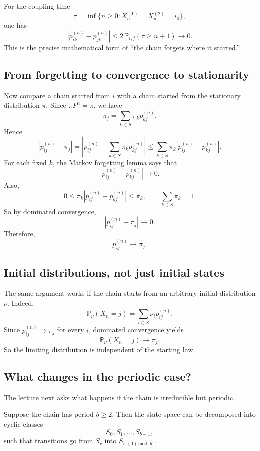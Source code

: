 \documentclass[11pt]{article}
\theoremstyle{definition}
\begin{document}
\begin{keyformula}
For the coupling time
\[
\tau=\inf\{n\ge 0 : X_n^{(1)}=X_n^{(2)}=i_0\},
\]
one has
\[
\left|p_{ik}^{(n)}-p_{jk}^{(n)}\right|
\le
2\,\overline{\mathbb P}_{i,j}(\tau\ge n+1)
\longrightarrow 0.
\]
This is the precise mathematical form of ``the chain forgets where it started.''
\end{keyformula}

\subsection{From forgetting to convergence to stationarity}

Now compare a chain started from \(i\) with a chain started from the stationary distribution \(\pi\). Since \(\pi P^n=\pi\), we have
\[
\pi_j = \sum_{k\in S}\pi_k p_{kj}^{(n)}.
\]
Hence
\[
\left|p_{ij}^{(n)}-\pi_j\right|
=
\left|p_{ij}^{(n)}-\sum_{k\in S}\pi_k p_{kj}^{(n)}\right|
\le
\sum_{k\in S}\pi_k\left|p_{ij}^{(n)}-p_{kj}^{(n)}\right|.
\]
For each fixed \(k\), the Markov forgetting lemma says that
\[
\left|p_{ij}^{(n)}-p_{kj}^{(n)}\right|\to 0.
\]
Also,
\[
0\le \pi_k\left|p_{ij}^{(n)}-p_{kj}^{(n)}\right|\le \pi_k,
\qquad
\sum_{k\in S}\pi_k=1.
\]
So by dominated convergence,
\[
\left|p_{ij}^{(n)}-\pi_j\right|\to 0.
\]
Therefore,
\[
p_{ij}^{(n)}\to \pi_j.
\]

\subsection{Initial distributions, not just initial states}

The same argument works if the chain starts from an arbitrary initial distribution \(\nu\). Indeed,
\[
\mathbb P_\nu(X_n=j)=\sum_{i\in S}\nu_i p_{ij}^{(n)}.
\]
Since \(p_{ij}^{(n)}\to \pi_j\) for every \(i\), dominated convergence yields
\[
\mathbb P_\nu(X_n=j)\to \pi_j.
\]
So the limiting distribution is independent of the starting law.

\subsection{What changes in the periodic case?}

The lecture next asks what happens if the chain is irreducible but periodic.

Suppose the chain has period \(b\ge 2\). Then the state space can be decomposed into cyclic classes
\[
S_0,S_1,\dots,S_{b-1},
\]
such that transitions go from \(S_r\) into \(S_{r+1\!\!\pmod b}\).
\end{document}
